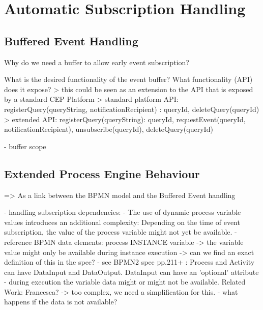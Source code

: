 \chapter{Automatic Subscription Handling}\label{ch:automaticsubscription}

\section{Buffered Event Handling}
Why do we need a buffer to allow early event subscription?

What is the desired functionality of the event buffer? What functionality (API) does it expose?
> this could be seen as an extension to the API that is exposed by a standard CEP Platform
> standard platform API: registerQuery(queryString, notificationRecipient) : queryId, deleteQuery(queryId)
> extended API: registerQuery(queryString): queryId, requestEvent(queryId, notificationRecipient), unsubscribe(queryId), deleteQuery(queryId)


- buffer scope


\section{Extended Process Engine Behaviour}
=> As a link between the BPMN model and the Buffered Event handling



- handling subscription dependencies:
- The use of dynamic process variable values introduces an additional complexity: Depending on the time of event subscription, the value of the process variable might not yet be available.
- reference BPMN data elements: process INSTANCE variable
-> the variable value might only be available during instance execution
-> can we find an exact definition of this in the spec?
- see BPMN2 spec pp.211+ : Process and Activity can have DataInput and DataOutput. DataInput can have an 'optional' attribute
- during execution the variable data might or might not be available. Related Work: Francesca?
-> too complex, we need a simplification for this.
- what happens if the data is not available?
